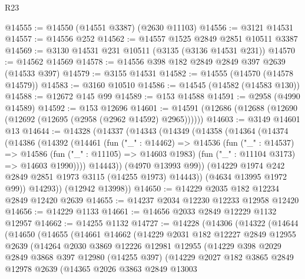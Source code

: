 \begin{lexlean}{R23}
\begin{coremodule}
@14555 := @14550 (@14551 @3387) (@2630 @11103)
@14556 := @3121 @14531
@14557 := @14556 @252
@14562 := @14557 @1525 @2849 @2851 @10511 @3387
@14569 := @3130 @14531 @231 @10511 (@3135 (@3136 @14531 @231))
@14570 := @14562 @14569
@14578 := @14556 @398 @182 @2849 @2849 @397 @2639 (@14533 @397)
@14579 := @3155 @14531
@14582 := @14555 (@14570 (@14578 @14579))
@14583 := @3160 @10510
@14586 := @14545 (@14582 (@14583 @130))
@14588 := @12672 @145 @99
@14589 := @153 @14588
@14591 := @2958 (@4990 @14589)
@14592 := @153 @12696
@14601 := @14591 (@12686 (@12688 (@12690 (@12692 (@12695 (@2958 (@2962 @14592) @2965))))))
@14603 := @3149 @14601 @13
@14644 := @14328
    (@14337
      (@14343
        (@14349
          (@14358
            (@14364
              (@14374
                (@14386
                  (@14392
                    (@14461
                      (fun ("_" : @14462) =>
                      @14536
                        (fun ("_" : @14537) =>
                        @14586
                          (fun ("_" : @11105) => @14603 @1983)
                          (fun ("_" : @11104 @3173) => @14603 @1990))))
                    @14443))
                (@4970 @13993 @99))
              (@14229 @1974 @242 @2849 @2851 @1973 @3115 (@14255 @1973) @14443))
            (@4634 @13995 @1972 @99))
          @14293))
      (@12942 @13998))
@14650 := @14229 @2035 @182 @12234 @2849 @12420 @2639
@14655 := @14237 @2034 @12230 @12233 @12958 @12420
@14656 := @14229 @1133
@14661 := @14656 @2033 @2849 @12229 @1132 @12957
@14662 := @14255 @1132
@14727 := @14228
    (@14306
      (@14322
        (@14644
          (@14650
            (@14655
              (@14661
                @14662
                (@14229
                  @2031
                  @182
                  @12227
                  @2849
                  @12955
                  @2639
                  (@14264
                    @2030
                    @3869
                    @12226
                    @12981
                    @12955
                    (@14229
                      @398
                      @2029
                      @2849
                      @3868
                      @397
                      @12980
                      (@14255 @397)
                      (@14229
                        @2027
                        @182
                        @3865
                        @2849
                        @12978
                        @2639
                        (@14365
                          @2026
                          @3863
                          @2849
                          @13003

\end{coremodule}
\end{lexlean}
